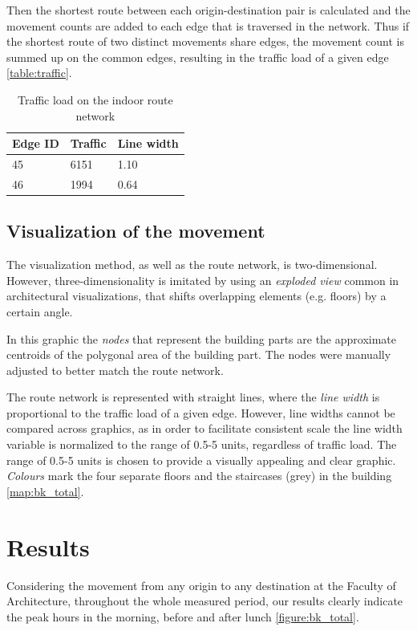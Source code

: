 Then the shortest route between each origin-destination pair is calculated and
the movement counts are added to each edge that is traversed in the network.
Thus if the shortest route of two distinct movements share edges, the movement
count is summed up on the common edges, resulting in the traffic load of a given
edge \autoref{table:traffic}.

\begin{table}[H]
\centering
\captionsetup{justification=centering}
\caption{Traffic load on the indoor route network}
\label{table:traffic}
\begin{tabular}{@{}lll@{}}
\toprule
Edge ID & Traffic & Line width \\ \midrule
45      & 6151    & 1.10       \\
46      & 1994    & 0.64       \\ \bottomrule
\end{tabular}
\end{table}


\subsection{Visualization of the movement}
The visualization method, as well as the route network, is two-dimensional.
However, three-dimensionality is imitated by using an \textit{exploded view}
common in architectural visualizations, that shifts overlapping elements (e.g.
floors) by a certain angle.

In this graphic the \textit{nodes} that represent the building parts are the 
approximate centroids of the polygonal area of the building part. The nodes were 
manually adjusted
to better match the route network.

The route network is represented with
straight lines, where the \textit{line width} is proportional to the traffic
load of a given edge. However, line widths cannot be compared across graphics, as in order
to facilitate consistent scale the line width variable is normalized to
the range of 0.5-5 units, regardless of traffic load. The range of 0.5-5 units
is chosen to provide a visually appealing and clear graphic. \textit{Colours}
mark the four separate floors and the staircases (grey) in the building
\autoref{map:bk_total}.

\section{Results}
Considering the movement from any origin to any destination at the Faculty of
Architecture, throughout the whole measured period, our results clearly indicate
the peak hours in the morning, before and after lunch \autoref{figure:bk_total}.

